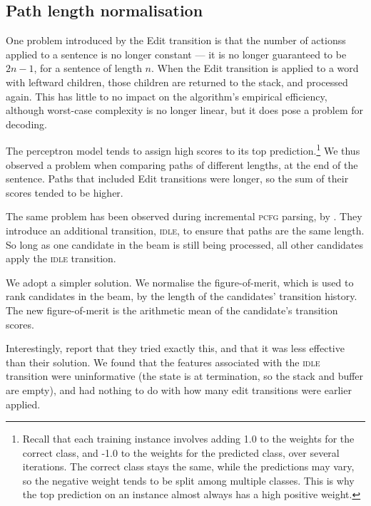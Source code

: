 \documentclass[11pt,letterpaper]{article}
\begin{document}


\subsection{Path length normalisation}

One problem introduced by the Edit transition is that the number of
actionss applied to a sentence is no longer constant --- it is no longer guaranteed
to be $2n-1$, for a sentence of length $n$. When the Edit transition is
applied to a word with leftward children, those children are returned to the stack,
and processed again.  This has little to no impact on the algorithm's empirical
efficiency, although worst-case complexity is no longer linear, but it does
pose a problem for decoding.

The perceptron model tends to assign
high scores to its top prediction.\footnote{Recall that each training instance
involves adding 1.0 to the weights for the correct class, and -1.0 to the weights
for the predicted class, over several iterations. The correct class stays the
same, while the predictions may vary, so the negative weight tends to be split
among multiple classes. This is why the top prediction on an instance almost
always has a high positive weight.}
We thus observed a problem when comparing paths of different lengths, at the end
of the sentence. Paths that included Edit transitions were longer,
so the sum of their scores tended to be higher.

The same problem has been observed during incremental \textsc{pcfg} parsing,
by \citet{zhang:13}.  They introduce an additional transition, \textsc{idle},
to ensure that paths are the same length. So long as one candidate in the beam
is still being processed, all other candidates apply the \textsc{idle} transition.

We adopt a simpler solution.  We normalise the figure-of-merit, which is used to rank
candidates in the beam, by the length of the candidates' transition history. The
new figure-of-merit is the
arithmetic mean of the candidate's transition scores.

Interestingly, \citet{zhang:13} report that they tried exactly this, and that it
was less effective than their solution. We found that the features
associated with the \textsc{idle} transition were uninformative (the state is at
termination, so the stack and buffer are empty), and had nothing to do with how
many edit transitions were earlier applied.
\end{document}
